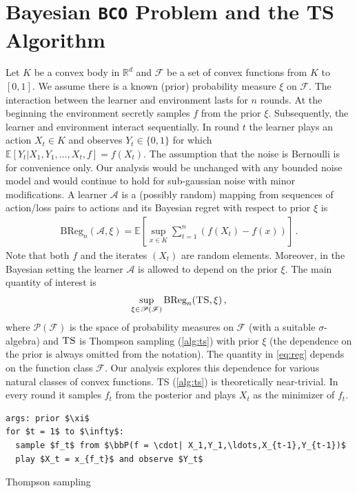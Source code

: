 \documentclass[letter, 12pt]{report}
\newcommand{\R}{\mathbb R}
\newcommand{\BReg}{\textrm{BReg}}
\newcommand{\E}{\mathbb E}
\newcommand{\sF}{\mathscr F}
\newcommand{\sA}{\mathscr A}
\newcommand{\sP}{\mathscr P}
\newcommand{\bbP}{\mathbb P}
\newcommand{\1}{\mathbf{1}}
\newcommand{\bco}{\texttt{BCO}\xspace}
\newcommand{\ts}{\textsc{TS}\xspace}
\theoremstyle{plain}
\theoremstyle{definition}
\theoremstyle{remark}
\begin{document}
\chapter{Bayesian \bco Problem and the \ts Algorithm}
Let $K$ be a convex body in $\R^d$ and $\sF$ be a set of convex functions from $K$ to $[0,1]$.
We assume there is a known (prior) probability measure $\xi$ on $\sF$. The interaction between the learner and environment
lasts for $n$ rounds. At the beginning the environment secretly samples $f$ from the prior $\xi$.
Subsequently, the learner and environment interact sequentially. In round $t$ the learner plays an action $X_t \in K$ and observes
$Y_t \in \{0, 1\}$ for which $\E[Y_t|X_1,Y_1,\ldots,X_t,f] = f(X_t)$.
The assumption that the noise is Bernoulli is for convenience only. Our analysis would be unchanged with any bounded noise model and would continue to hold
for sub-gaussian noise with minor modifications.
A learner $\sA$ is a (possibly random) mapping from sequences of action/loss pairs to actions and its Bayesian regret with respect to prior $\xi$ is
\begin{align*}
    \BReg_n(\sA, \xi) = \E\left[\sup_{x \in K} \sum_{t=1}^n \left(f(X_t) - f(x)\right)\right] \,.
\end{align*}
Note that both $f$ and the iterates $(X_t)$ are random elements. Moreover, in the Bayesian setting the learner $\sA$ is allowed to depend on the prior $\xi$.
The main quantity of interest is
\begin{align}
    \sup_{\xi \in \sP(\sF)} \BReg_n(\ts, \xi)\,,
    \label{eq:reg}
\end{align}
where $\sP(\sF)$ is the space of probability measures on $\sF$ (with a suitable $\sigma$-algebra) and $\ts$ is Thompson sampling (\cref{alg:ts})
with prior $\xi$ (the dependence on the prior is always omitted from the notation).
The quantity in \cref{eq:reg} depends on the function class $\sF$. Our analysis explores this dependence for various natural classes of convex functions.
\ts{} (\cref{alg:ts}) is theoretically near-trivial. In every round it samples $f_t$ from the posterior and plays $X_t$ as the minimizer of $f_t$.
\begin{algorithm}[h!]
    \begin{minipage}{12cm}
        \begin{mdframed}
            \begin{lstlisting}
args: prior $\xi$
for $t = 1$ to $\infty$:
  sample $f_t$ from $\bbP(f = \cdot| X_1,Y_1,\ldots,X_{t-1},Y_{t-1})$
  play $X_t = x_{f_t}$ and observe $Y_t$
\end{lstlisting}
            \caption{Thompson sampling}\label{alg:ts}
        \end{mdframed}
    \end{minipage}
\end{algorithm}
\end{document}
